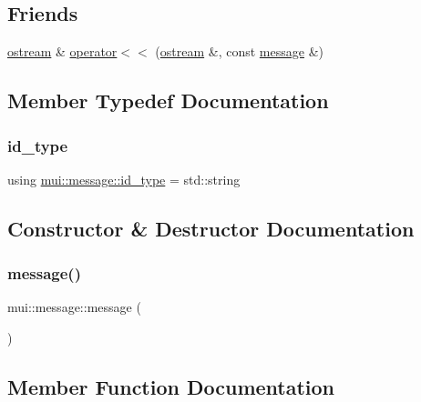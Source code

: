 \subsection*{Friends}
\begin{DoxyCompactItemize}
\item 
\hyperlink{classmui_1_1ostream}{ostream} \& \hyperlink{structmui_1_1message_a4fbfde81d9ba815d34bfb6f79a66882a}{operator$<$$<$} (\hyperlink{classmui_1_1ostream}{ostream} \&, const \hyperlink{structmui_1_1message}{message} \&)
\end{DoxyCompactItemize}


\subsection{Member Typedef Documentation}
\mbox{\label{structmui_1_1message_aecbd0ac37983ce799121a1d78d97a9c1}} 
\subsubsection{\texorpdfstring{id\+\_\+type}{id\_type}}
{\footnotesize\ttfamily using \hyperlink{structmui_1_1message_aecbd0ac37983ce799121a1d78d97a9c1}{mui\+::message\+::id\+\_\+type} =  std\+::string}



\subsection{Constructor \& Destructor Documentation}
\mbox{\label{structmui_1_1message_ada5eb3ee6f884e50de90361a9dd2005a}} 
\subsubsection{\texorpdfstring{message()}{message()}}
{\footnotesize\ttfamily mui\+::message\+::message (\begin{DoxyParamCaption}{ }\end{DoxyParamCaption})\hspace{0.3cm}{\ttfamily [inline]}}



\subsection{Member Function Documentation}
\mbox{\label{structmui_1_1message_a8fb9fd5730cb451cc20182b736ba1bfc}} 
